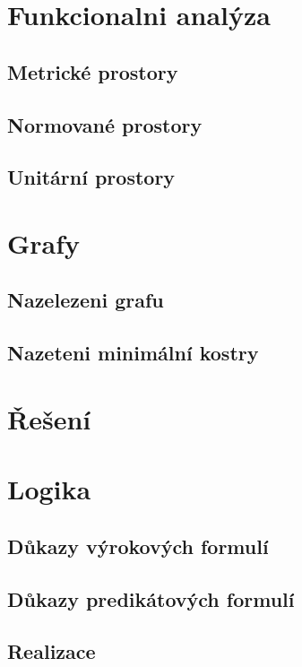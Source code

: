 \documentclass[12pt,a4paper,notitlepage,final]{article}
\begin{document}
\section{Funkcionalni analýza}
\subsection{Metrické prostory}               	
\subsection{Normované prostory}              	
\subsection{Unitární prostory}               	
\section{Grafy}
\subsection{Nazelezeni grafu}                	
\subsection{Nazeteni minimální kostry} 				

\section*{Řešení}
\setcounter{section}{1}
\section{Logika}
\subsection{Důkazy výrokových formulí}      
\subsection{Důkazy predikátových formulí}   
\subsection{Realizace}                      
\end{document}
